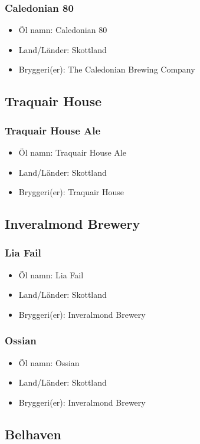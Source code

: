 \documentclass[11pt]{article}
\begin{document}
\subsubsection{Caledonian 80}
\label{sec:orgde581af}
\begin{itemize}
\item Öl namn: Caledonian 80
\item Land/Länder: Skottland
\item Bryggeri(er): The Caledonian Brewing Company
\end{itemize}
\subsection{Traquair House}
\label{sec:org49f5664}
\subsubsection{Traquair House Ale}
\label{sec:orgb6d7dd9}
\begin{itemize}
\item Öl namn: Traquair House Ale
\item Land/Länder: Skottland
\item Bryggeri(er): Traquair House
\end{itemize}
\subsection{Inveralmond Brewery}
\label{sec:org33ac984}
\subsubsection{Lia Fail}
\label{sec:org5671213}
\begin{itemize}
\item Öl namn: Lia Fail
\item Land/Länder: Skottland
\item Bryggeri(er): Inveralmond Brewery
\end{itemize}
\subsubsection{Ossian}
\label{sec:org8278e15}
\begin{itemize}
\item Öl namn: Ossian
\item Land/Länder: Skottland
\item Bryggeri(er): Inveralmond Brewery
\end{itemize}
\subsection{Belhaven}
\label{sec:org907e8d2}
\end{document}
